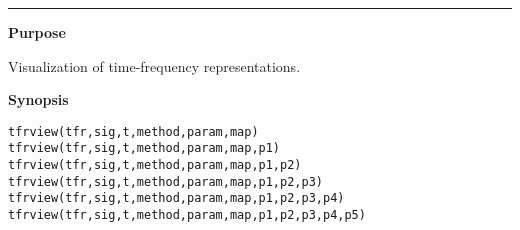 

\hspace*{-1.6cm}{\Large \bf tfrview}

\vspace*{-.4cm}
\hspace*{-1.6cm}\rule[0in]{16.5cm}{.02cm}
\vspace*{.2cm}

{\bf \large {}\selectfont Purpose}\\
\hspace*{1.5cm}
\begin{minipage}[t]{13.5cm}
Visualization of time-frequency representations.
\end{minipage}
\vspace*{.5cm}

{\bf \large {}\selectfont Synopsis}\\
\hspace*{1.5cm}
\begin{minipage}[t]{13.5cm}
\begin{verbatim}
tfrview(tfr,sig,t,method,param,map) 
tfrview(tfr,sig,t,method,param,map,p1) 
tfrview(tfr,sig,t,method,param,map,p1,p2) 
tfrview(tfr,sig,t,method,param,map,p1,p2,p3) 
tfrview(tfr,sig,t,method,param,map,p1,p2,p3,p4) 
tfrview(tfr,sig,t,method,param,map,p1,p2,p3,p4,p5) 
\end{verbatim}
\end{minipage}
\vspace*{.5cm}

